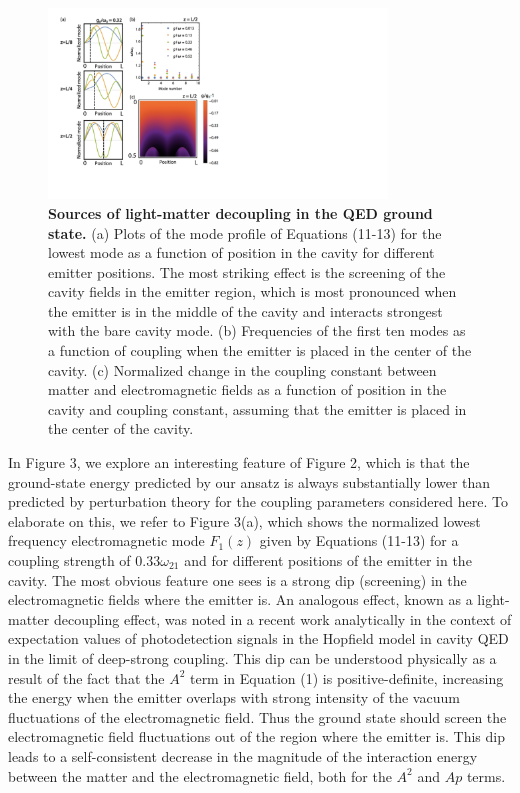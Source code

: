 \documentclass[aps,prb,twocolumn,
	groupedaddress,superscriptaddress,
	amsfonts,amssymb,amsmath,floatfix,
	citeautoscript]{revtex4-1}
\begin{document}
\begin{figure}[t]
\includegraphics[width=9cm]{fig3.pdf}
\caption{\textbf{Sources of light-matter decoupling in the QED ground state.} (a) Plots of the mode profile of Equations (11-13) for the lowest mode as a function of position in the cavity for different emitter positions. The most striking effect is the screening of the cavity fields in the emitter region, which is most pronounced when the emitter is in the middle of the cavity and interacts strongest with the bare cavity mode. (b) Frequencies of the first ten modes as a function of coupling when the emitter is placed in the center of the cavity. (c) Normalized change in the coupling constant between matter and electromagnetic fields as a function of position in the cavity and coupling constant, assuming that the emitter is placed in the center of the cavity.  }
\label{fig:decoupling}
\end{figure}

In Figure 3, we explore an interesting feature of Figure 2, which is that the ground-state energy predicted by our ansatz is always substantially lower than predicted by perturbation theory for the coupling parameters considered here. To elaborate on this, we refer to Figure 3(a), which shows the normalized lowest frequency electromagnetic mode $F_1(z)$ given by Equations (11-13) for a coupling strength of $0.33\omega_{21}$ and for different positions of the emitter in the cavity. The most obvious feature one sees is a strong dip (screening) in the electromagnetic fields where the emitter is. An analogous effect, known as a light-matter decoupling effect, was noted in a recent work analytically in the context of expectation values of photodetection signals in the Hopfield model in cavity QED in the limit of deep-strong coupling. This dip can be understood physically as a result of the fact that the $A^2$ term in Equation (1) is positive-definite, increasing the energy when the emitter overlaps with strong intensity of the vacuum fluctuations of the electromagnetic field. Thus the ground state should screen the electromagnetic field fluctuations out of the region where the emitter is. This dip leads to a self-consistent decrease in the magnitude of the interaction energy between the matter and the electromagnetic field, both for the $A^2$ and $Ap$ terms. 
\end{document}
